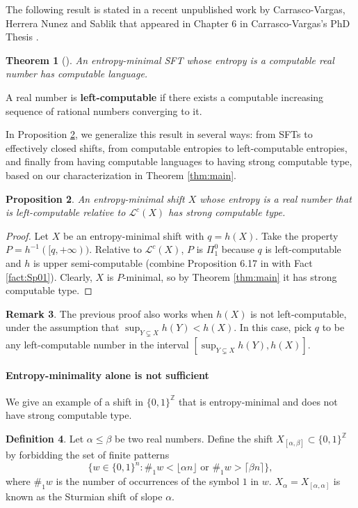 \documentclass[french,american]{article}
\theoremstyle{plain}
\newtheorem{theorem}{Theorem}[section]
\newtheorem{proposition}[theorem]{Proposition}
\theoremstyle{definition}
\newtheorem{definition}[theorem]{Definition}
\newtheorem{remark}[theorem]{Remark}
\theoremstyle{remark}
\theoremstyle{plain}
\begin{document}
The following result is stated in a recent unpublished work by Carrasco-Vargas,
Herrera Nunez and Sablik that appeared in Chapter 6 in Carrasco-Vargas's PhD
Thesis \cite{Phdnicanor2024}.
\begin{theorem}[\cite{Phdnicanor2024}]
An entropy-minimal SFT whose entropy is a computable real number
has computable language.
\end{theorem}

A real number is \textbf{left-computable} if there exists a computable
increasing sequence of rational numbers converging to it.

In Proposition \ref{prop:An-entropy-minimal-subshift}, we generalize
this result in several ways: from SFTs to effectively closed shifts, from computable entropies to left-computable entropies, and finally from having computable languages to having strong computable type, based on our characterization in Theorem \ref{thm:main}.
\begin{proposition}
\label{prop:An-entropy-minimal-subshift}An entropy-minimal shift $X$
whose entropy is a real number that is left-computable relative to $\mathcal L^c(X)$ has strong computable
type.
\end{proposition}

\begin{proof}
Let $X$ be an entropy-minimal shift with $q = h(X)$. Take the property $P=h^{-1}([q,+\infty))$. Relative to $\mathcal L^c(X)$, $P$ is $\Pi_{1}^{0}$ because
$q$ is left-computable and $h$ is upper semi-computable (combine
Proposition 6.17 in \cite{Phdnicanor2024} with Fact \ref{fact:Sp01}).
Clearly, $X$ is $P$-minimal, so by Theorem \ref{thm:main} it has strong computable type.
\end{proof}

\begin{remark}
The previous proof also works when $h(X)$ is not left-computable, under the assumption that $\sup_{Y\subsetneq X} h(Y) < h(X)$. In this case, pick $q$ to be any left-computable number in the interval $[\sup_{Y\subsetneq X} h(Y), h(X)]$.
\end{remark}

\paragraph*{Entropy-minimality alone is not sufficient}

We give an example of a shift in $\{0,1\}^{\mathbb{Z}}$ that is entropy-minimal
and does not have strong computable type.
\begin{definition}
\label{def:sturmian}Let $\alpha\leq\beta$ be two real numbers. Define
the shift $X_{[\alpha,\beta]}\subset\{0,1\}^{\mathbb{Z}}$ by forbidding
the set of finite patterns 
\[
\{w\in\{0,1\}^{n}:\#_{1}w<\lfloor\alpha n\rfloor\text{ or }\#_{1}w>\lceil\beta n\rceil\},
\]
where $\#_{1}w$ is the number of occurrences of the symbol $1$ in
$w$. $X_{\alpha}=X_{[\alpha,\alpha]}$ is known as the Sturmian shift
of slope $\alpha$.
 \end{definition}
\end{document}

